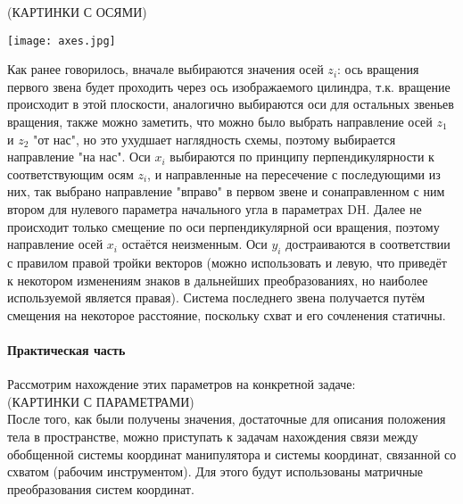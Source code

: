 (КАРТИНКИ С ОСЯМИ)\\

\begin{center}
    \texttt{[image: axes.jpg]}\\
\end{center}

\hspace*{\parindent}Как ранее говорилось, вначале выбираются значения осей $z_i$: ось вращения первого звена будет проходить через ось изображаемого цилиндра, т.к. вращение происходит в этой плоскости, аналогично выбираются оси для остальных звеньев вращения, также можно заметить, что можно было выбрать направление осей $z_1$ и $z_2$ "от нас", но это  ухудшает наглядность схемы, поэтому выбирается направление "на нас". Оси $x_i$ выбираются по принципу перпендикулярности к соответствующим осям $z_i$, и направленные на пересечение с последующими из них, так выбрано направление "вправо" в первом звене и сонаправленном с ним втором для нулевого параметра начального угла в параметрах DH. Далее не происходит только смещение по оси перпендикулярной оси вращения, поэтому направление осей $x_i$ остаётся неизменным. Оси $y_i$ достраиваются в соответствии с правилом правой тройки векторов (можно использовать и левую, что приведёт к некотором изменениям знаков в дальнейших преобразованиях, но наиболее используемой является правая). Система последнего звена получается путём смещения на некоторое расстояние, поскольку схват и его сочленения статичны.\\
 
 \paragraph*{Практическая часть\\}
 
\hspace*{\parindent}Рассмотрим нахождение этих параметров на конкретной задаче:\\
(КАРТИНКИ С ПАРАМЕТРАМИ)\\

\hspace*{\parindent}После того, как были получены значения, достаточные для описания положения тела в пространстве, можно приступать к задачам нахождения связи между обобщенной системы координат манипулятора и системы координат, связанной со схватом (рабочим инструментом). Для этого будут использованы матричные преобразования систем координат.\\

